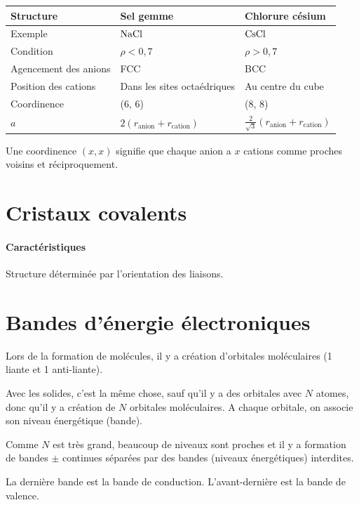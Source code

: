 \documentclass[11pt,a4paper,french]{article}
\begin{document}
\begin{center}
	\begin{tabular}{|l|l|l|}
		\hline
		Structure & Sel gemme & Chlorure césium\\
		\hline
		Exemple & $\ce{NaCl}$ & $\ce{CsCl}$\\
		\hline
		Condition & $\rho < 0,7$ & $\rho > 0,7$\\
		\hline
		Agencement des anions & FCC & BCC\\
		\hline
		Position des cations & Dans les sites octaédriques & Au centre du cube\\
		\hline
		Coordinence & (6, 6) & (8, 8)\\
		\hline
		$a$ & $2 (r_\mathrm{anion} + r_\mathrm{cation})$ & $\frac{2}{\sqrt{3}} (r_\mathrm{anion} + r_\mathrm{cation})$\\
		\hline
	\end{tabular}
\end{center}
Une coordinence $(x, x)$ signifie que chaque anion a $x$ cations comme proches voisins et réciproquement.

\section{Cristaux covalents}

\paragraph{Caractéristiques}
Structure déterminée par l'orientation des liaisons.

\section{Bandes d'énergie électroniques}

Lors de la formation de molécules, il y a création d'orbitales moléculaires (1 liante et 1 anti-liante).

Avec les solides, c'est la même chose, sauf qu'il y a des orbitales avec $N$ atomes, donc qu'il y a création de $N$ orbitales moléculaires.
A chaque orbitale, on associe son niveau énergétique (bande).

Comme $N$ est très grand, beaucoup de niveaux sont proches et il y a formation de bandes $\pm$ continues séparées par des bandes (niveaux énergétiques) interdites.

La dernière bande est la bande de conduction.
L'avant-dernière est la bande de valence.
\end{document}
